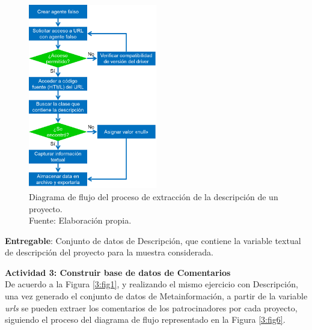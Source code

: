 \begin{figure}[h]
	\begin{center}
		\includegraphics[width=0.5\textwidth]{3/figures/diagrama_flujo_scrapping_descripcion.png}
		\caption[Diagrama de flujo del proceso de extracción de la descripción de un proyecto]{Diagrama de flujo del proceso de extracción de la descripción de un proyecto.\\
			Fuente: Elaboración propia.}
		\label{3:fig5}
	\end{center}
\end{figure}

\textbf{Entregable}: Conjunto de datos de Descripción, que contiene la variable textual de descripción del proyecto para la muestra considerada.

\textbf{Actividad 3: Construir base de datos de Comentarios}
\\
De acuerdo a la Figura \ref{3:fig1}, y realizando el mismo ejercicio con Descripción, una vez generado el conjunto de datos de Metainformación, a partir de la variable \textit{urls} se pueden extraer los comentarios de los patrocinadores por cada proyecto, siguiendo el proceso del diagrama de flujo representado en la Figura \ref{3:fig6}.

